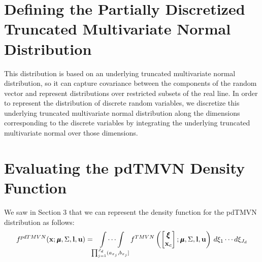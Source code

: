 \documentclass[fleqn]{article}\usepackage[]{graphicx}\usepackage[]{color}
\begin{document}
\section{Defining the Partially Discretized Truncated Multivariate Normal Distribution}
\label{sec:definition}

This distribution is based on an underlying truncated multivariate normal distribution, so it can capture covariance between the components of the random vector and represent distributions over restricted subsets of the real line.  In order to represent the distribution of discrete random variables, we discretize this underlying truncated multivariate normal distribution along the dimensions corresponding to the discrete variables by integrating the underlying truncated multivariate normal over those dimensions.


\section{Evaluating the pdTMVN Density Function}
\label{sec:evalDensity}

We saw in Section 3 that we can represent the density function for the pdTMVN distribution as follows:
\begin{equation}
f^{pdTMVN}(\bx ; \bmu, \Sigma, \bl, \bu) = \idotsint\limits_{\prod_{j=1}^{J_d} (a_{x_j}, b_{x_j}]} f^{TMVN}\left(\begin{bmatrix} \bxi \\ \bx_c \end{bmatrix}; \bmu, \Sigma, \bl, \bu\right) \, d \xi_1 \cdots d \xi_{J_d} \label{eqn:pdtmvnDensityFn}
\end{equation}
\end{document}
